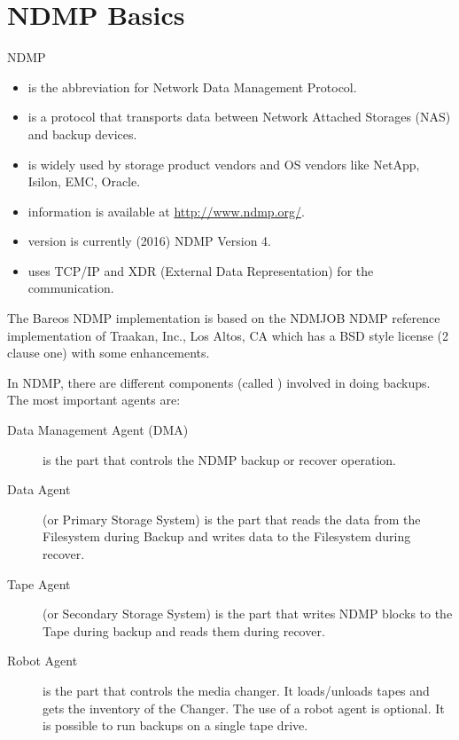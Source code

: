 
\section{NDMP Basics}

NDMP
\begin{itemize}
    \item is the abbreviation for Network Data Management Protocol.
    \item is a protocol that transports data between Network Attached Storages (NAS) and backup devices.
    \item is widely used by storage product vendors and OS vendors like NetApp, Isilon, EMC, Oracle.
    \item information is available at \url{http://www.ndmp.org/}.
    \item version is currently (2016) NDMP Version 4.
    \item uses TCP/IP and XDR (External Data Representation) for the communication.
\end{itemize}



The Bareos NDMP implementation is based on the NDMJOB NDMP reference implementation of Traakan, Inc., Los Altos, CA which has a BSD style license (2 clause one) with some enhancements.


In NDMP, there are different components (called ) involved in doing backups.
The most important agents are:

\begin{description}
  \item[Data Management Agent (DMA)]
  is the part that controls the NDMP backup or recover operation.

  \item[Data Agent] (or Primary Storage System)
  is the part that reads the data from the Filesystem during Backup and writes data to the Filesystem during recover.

  \item[Tape Agent] (or Secondary Storage System)
  is the part that writes NDMP blocks to the Tape during backup and reads them during recover.

  \item[Robot Agent]
  is the part that controls the media changer. It loads/unloads tapes and gets the inventory of the Changer. The use of a robot agent is optional. It is possible to run backups on a single tape drive.
\end{description}

